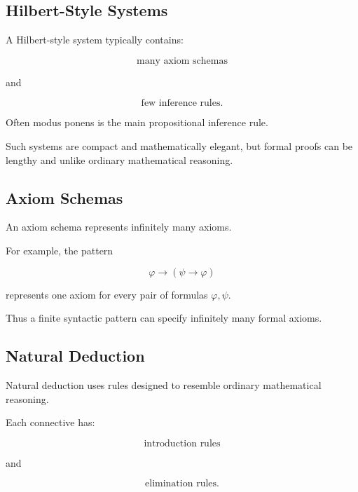\subsection{Hilbert-Style Systems}
\label{subsec:hilbert-style-systems}

A Hilbert-style system typically contains:

\[
\boxed{
\text{many axiom schemas}
}
\]

and

\[
\boxed{
\text{few inference rules}.
}
\]

Often modus ponens is the main propositional inference rule.

Such systems are compact and mathematically elegant, but formal proofs can
be lengthy and unlike ordinary mathematical reasoning.

\subsection{Axiom Schemas}
\label{subsec:proof-theory-axiom-schemas}

An axiom schema represents infinitely many axioms.

For example, the pattern

\[
\boxed{
\varphi
\rightarrow
(\psi\rightarrow\varphi)
}
\]

represents one axiom for every pair of formulas \(\varphi,\psi\).

Thus a finite syntactic pattern can specify infinitely many formal axioms.

\subsection{Natural Deduction}
\label{subsec:proof-theory-natural-deduction}

Natural deduction uses rules designed to resemble ordinary mathematical
reasoning.

Each connective has:

\[
\boxed{
\text{introduction rules}
}
\]

and

\[
\boxed{
\text{elimination rules}.
}
\]

